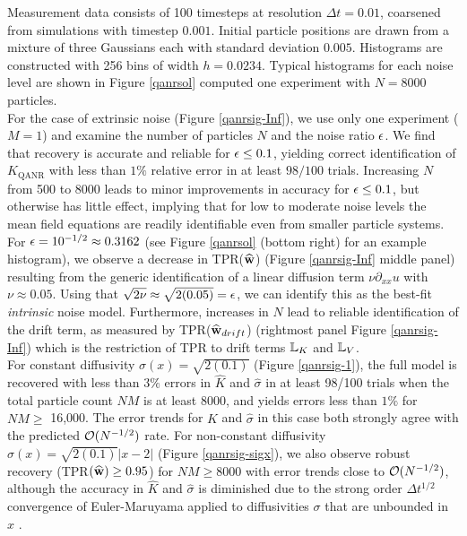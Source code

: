 \documentclass[english,reqno]{amsart}
\begin{document}
Measurement data consists of 100 timesteps at resolution $\Delta t =0.01$, coarsened from simulations with timestep $0.001$. Initial particle positions are drawn from a mixture of three Gaussians each with standard deviation $0.005$. Histograms are constructed with 256 bins of width $h=0.0234$. Typical histograms for each noise level are shown in Figure \ref{qanrsol} computed one experiment with $N=8000$ particles.\\

For the case of extrinsic noise (Figure \ref{qanrsig-Inf}), we use only one experiment ($M=1$) and examine the number of particles $N$ and the noise ratio $\epsilon$. We find that recovery is accurate and reliable for $\epsilon\leq 0.1$, yielding correct identification of $K_{\text{QANR}}$ with less than $1\%$ relative error in at least $98/100$ trials. Increasing $N$ from 500 to 8000 leads to minor improvements in accuracy for $\epsilon\leq 0.1$, but otherwise has little effect, implying that for low to moderate noise levels the mean field equations are readily identifiable even from smaller particle systems. For $\epsilon=10^{-1/2}\approx 0.3162$ (see Figure \ref{qanrsol} (bottom right) for an example histogram), we observe a decrease in TPR(${\widehat{\mathbf{w}}}$) (Figure \ref{qanrsig-Inf} middle panel) resulting from the generic identification of a linear diffusion term $\nu\partial_{xx}u$ with $\nu\approx 0.05$. Using that $\sqrt{2\nu}\approx\sqrt{2(0.05)}=\epsilon$, we can identify this as the best-fit {\it intrinsic} noise model. Furthermore, increases in $N$ lead to reliable identification of the drift term, as measured by TPR(${\widehat{\mathbf{w}}}_{drift}$) (rightmost panel Figure \ref{qanrsig-Inf}) which is the restriction of TPR to drift terms $\mathbb{L}_K$ and $\mathbb{L}_V$.\\

For constant diffusivity $\sigma(x)=\sqrt{2(0.1)}$ (Figure \ref{qanrsig-1}), the full model is recovered with less than $3\%$ errors in $\hat{K}$ and $\hat{\sigma}$ in at least 98/100 trials when the total particle count $NM$ is at least $8000$, and yields errors less than $1\%$ for $NM\geq$ 16,000. The error trends for $\hat{K}$ and $\hat{\sigma}$ in this case both strongly agree with the predicted ${\mathcal{O}}(N^{-1/2})$ rate. For non-constant diffusivity $\sigma(x)=\sqrt{2(0.1)}|x-2|$ (Figure \ref{qanrsig-sigx}), we also observe robust recovery (TPR$({\widehat{\mathbf{w}}})\geq 0.95$) for $NM\geq 8000$ with error trends close to ${\mathcal{O}}(N^{-1/2})$, although the accuracy in $\hat{K}$ and $\hat{\sigma}$ is diminished due to the strong order $\Delta t^{1/2}$ convergence of Euler-Maruyama applied to diffusivities $\sigma$ that are unbounded in $x$ \cite{milstein1994numerical}.
\end{document}

